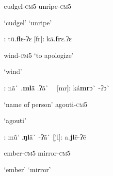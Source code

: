 \begin{styleindexi}
                    cudgel-\textsc{cm}5                                          unripe-\textsc{cm5}
\end{styleindexi}

\begin{styleindexi}
                    ‘cudgel’                                                ‘unripe’
\end{styleindexi}

\begin{styleindexi}
            [fl]:    tū.\textbf{fl}ɛ{}-ʔɛ                                       [fr]:      kā.\textbf{fr}ɛ.ʔɛ           
\end{styleindexi}

\begin{styleindexi}
                    wind-\textsc{cm}5                                              ‘to apologize’
\end{styleindexi}

\begin{styleindexi}
                    ‘wind’  
\end{styleindexi}

\begin{styleindexi}
            [ml]:  nã\`{} .\textbf{ml}ã\={} .ʔã\`{} ~                                   [mr]:     ká\textbf{mr}ɔ\`{} -ʔɔ\`{} 
\end{styleindexi}

\begin{styleindexi}
                    ‘name of person’                                    agouti-\textsc{cm}5
\end{styleindexi}

\begin{styleindexi}
                                                                              ‘agouti’ 
\end{styleindexi}

\begin{styleindexi}
            [ŋl]:    mũ\'{} .\textbf{ŋl}ã\`{} -ʔã\`{}                                     [jl]:      a.\textbf{jl}ē-ʔē               
\end{styleindexi}

\begin{styleindexi}
                    ember-\textsc{cm}5                                            mirror-\textsc{cm}5   
\end{styleindexi}

\begin{styleindexi}
                    ‘ember’                                                ‘mirror’
\end{styleindexi}

